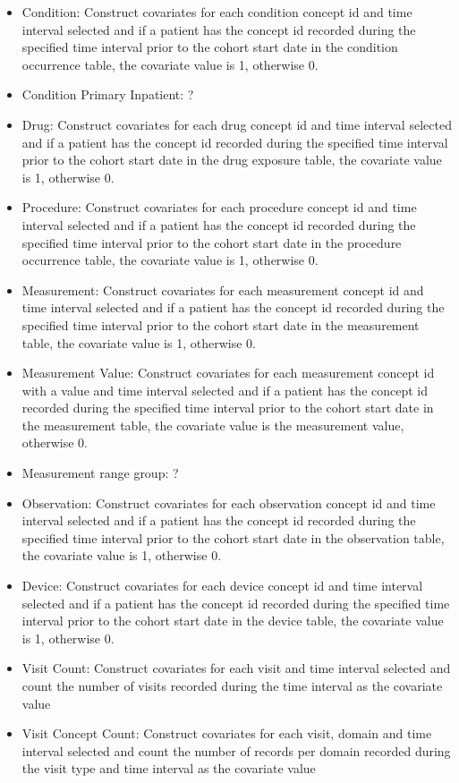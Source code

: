 \documentclass[11pt]{book}
\providecommand{\tightlist}{%
  \setlength{\itemsep}{0pt}\setlength{\parskip}{0pt}}
\theoremstyle{definition}
\theoremstyle{definition}
\theoremstyle{definition}
\theoremstyle{remark}
\begin{document}
\begin{itemize}
\tightlist
\item
  Condition: Construct covariates for each condition concept id and time interval selected and if a patient has the concept id recorded during the specified time interval prior to the cohort start date in the condition occurrence table, the covariate value is 1, otherwise 0.
\item
  Condition Primary Inpatient: ?
\item
  Drug: Construct covariates for each drug concept id and time interval selected and if a patient has the concept id recorded during the specified time interval prior to the cohort start date in the drug exposure table, the covariate value is 1, otherwise 0.
\item
  Procedure: Construct covariates for each procedure concept id and time interval selected and if a patient has the concept id recorded during the specified time interval prior to the cohort start date in the procedure occurrence table, the covariate value is 1, otherwise 0.
\item
  Measurement: Construct covariates for each measurement concept id and time interval selected and if a patient has the concept id recorded during the specified time interval prior to the cohort start date in the measurement table, the covariate value is 1, otherwise 0.
\item
  Measurement Value: Construct covariates for each measurement concept id with a value and time interval selected and if a patient has the concept id recorded during the specified time interval prior to the cohort start date in the measurement table, the covariate value is the measurement value, otherwise 0.
\item
  Measurement range group: ?
\item
  Observation: Construct covariates for each observation concept id and time interval selected and if a patient has the concept id recorded during the specified time interval prior to the cohort start date in the observation table, the covariate value is 1, otherwise 0.
\item
  Device: Construct covariates for each device concept id and time interval selected and if a patient has the concept id recorded during the specified time interval prior to the cohort start date in the device table, the covariate value is 1, otherwise 0.
\item
  Visit Count: Construct covariates for each visit and time interval selected and count the number of visits recorded during the time interval as the covariate value
\item
  Visit Concept Count: Construct covariates for each visit, domain and time interval selected and count the number of records per domain recorded during the visit type and time interval as the covariate value
\end{itemize}
\end{document}
